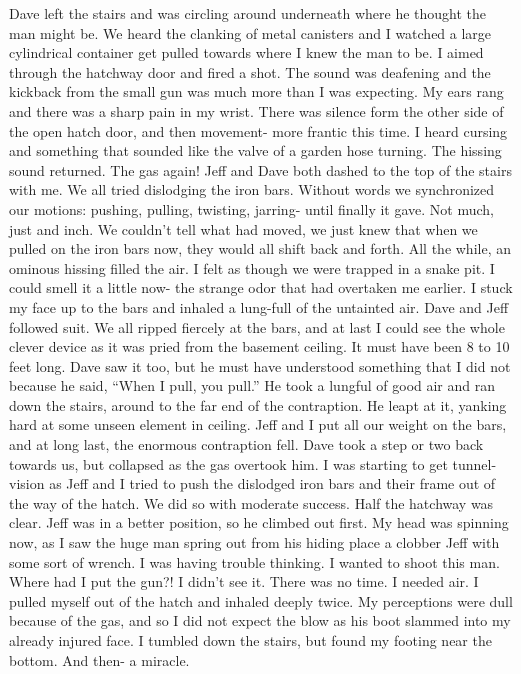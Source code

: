 \documentclass[a4paper]{article}
\begin{document}
Dave left the stairs and was circling around underneath where he thought the man might be.
We heard the clanking of metal canisters and I watched a large cylindrical container get pulled towards where I knew the man to be. I aimed through the hatchway door and fired a shot.
The sound was deafening and the kickback from the small gun was much more than I was expecting. My ears rang and there was a sharp pain in my wrist.
There was silence form the other side of the open hatch door, and then movement- more frantic this time. I heard cursing and something that sounded like the valve of a garden hose turning.
The hissing sound returned. The gas again! Jeff and Dave both dashed to the top of the stairs with me. We all tried dislodging the iron bars.
Without words we synchronized our motions: pushing, pulling, twisting, jarring- until finally it gave. Not much, just and inch. We couldn't tell what had moved, we just knew that when we pulled on the iron bars now, they would all shift back and forth.
All the while, an ominous hissing filled the air. I felt as though we were trapped in a snake pit. I could smell it a little now- the strange odor that had overtaken me earlier. I stuck my face up to the bars and inhaled a lung-full of the untainted air. Dave and Jeff followed suit.
We all ripped fiercely at the bars, and at last I could see the whole clever device as it was pried from the basement ceiling. It must have been 8 to 10 feet long. Dave saw it too, but he must have understood something that I did not because he said, “When I pull, you pull.”
He took a lungful of good air and ran down the stairs, around to the far end of the contraption. He leapt at it, yanking hard at some unseen element in ceiling. Jeff and I put all our weight on the bars, and at long last, the enormous contraption fell. Dave took a step or two back towards us, but collapsed as the gas overtook him.
I was starting to get tunnel-vision as Jeff and I tried to push the dislodged iron bars and their frame out of the way of the hatch. We did so with moderate success. Half the hatchway was clear. Jeff was in a better position, so he climbed out first. My head was spinning now, as I saw the huge man spring out from his hiding place a clobber Jeff with some sort of wrench.
I was having trouble thinking. I wanted to shoot this man. Where had I put the gun?!
I didn’t see it. There was no time. I needed air.
I pulled myself out of the hatch and inhaled deeply twice. My perceptions were dull because of the gas, and so I did not expect the blow as his boot slammed into my already injured face. I tumbled down the stairs, but found my footing near the bottom. And then- a miracle.
\end{document}
